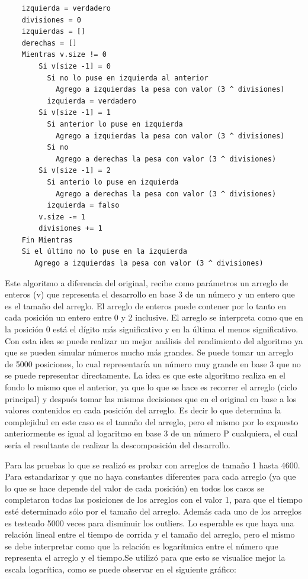 	\begin{codesnippet}
	\begin{verbatim}
	izquierda = verdadero
	divisiones = 0
	izquierdas = []
	derechas = []
	Mientras v.size != 0
	    Si v[size -1] = 0
	      Si no lo puse en izquierda al anterior
	        Agrego a izquierdas la pesa con valor (3 ^ divisiones)
	      izquierda = verdadero
	    Si v[size -1] = 1
	      Si anterior lo puse en izquierda
	        Agrego a izquierdas la pesa con valor (3 ^ divisiones)
	      Si no
	        Agrego a derechas la pesa con valor (3 ^ divisiones)
	    Si v[size -1] = 2
	      Si anterio lo puse en izquierda
	        Agrego a derechas la pesa con valor (3 ^ divisiones)
	      izquierda = falso
	    v.size -= 1
	    divisiones += 1
	Fin Mientras
	Si el último no lo puse en la izquierda
	   Agrego a izquierdas la pesa con valor (3 ^ divisiones)
	\end{verbatim}
	\end{codesnippet}

	Este algoritmo a diferencia del original, recibe como parámetros un arreglo de enteros (v) que representa el desarrollo en base 3 de un número y un entero que es el tamaño del arreglo. El arreglo de enteros puede contener por lo tanto en cada posición un entero entre 0 y 2 inclusive. El arreglo se interpreta como que en la posición 0 está el dígito más significativo y en la última el menos significativo.
	Con esta idea se puede realizar un mejor análisis del rendimiento del algoritmo ya que se pueden simular números mucho más grandes. Se puede tomar un arreglo de 5000 posiciones, lo cual representaría un número muy grande en base 3 que no se puede representar directamente. La idea es que este algoritmo realiza en el fondo lo mismo que el anterior, ya que lo que se hace es recorrer el arreglo (ciclo principal) y después tomar las mismas decisiones que en el original en base a los valores contenidos en cada posición del arreglo. Es decir lo que determina la complejidad en este caso es el tamaño del arreglo, pero el mismo por lo expuesto anteriormente es igual al logaritmo en base 3 de un número P cualquiera, el cual sería el resultante de realizar la descomposición del desarrollo.

	Para las pruebas lo que se realizó es probar con arreglos de tamaño 1 hasta 4600. Para estandarizar y que no haya constantes diferentes para cada arreglo (ya que lo que se hace depende del valor de cada posición) en todos los casos se completaron todas las posiciones de los arreglos con el valor 1, para que el tiempo esté determinado sólo por el tamaño del arreglo. Además cada uno de los arreglos es testeado 5000 veces para disminuir los outliers. Lo esperable es que haya una relación lineal entre el tiempo de corrida y el tamaño del arreglo, pero el mismo se debe interpretar como que la relación es logarítmica entre el número que representa el arreglo y el tiempo.Se utilizó para que esto se visualice mejor la escala logarítica, como se puede observar en el siguiente gráfico:  


